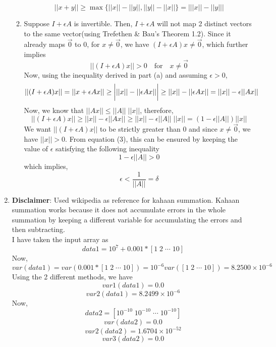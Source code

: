 \documentclass{article}
\begin{document}
\begin{enumerate}
\begin{enumerate}[label=(\alph*)]
        $$||x + y|| \geq \max\{||x|| - ||y||, ||y|| - ||x||\} = {\bigg |} ||x|| - ||y|| {\bigg |}$$
        \item Suppose $I + \epsilon A$ is invertible. Then, $I + \epsilon A$ will not map 2 distinct vectors to the same vector(using Trefethen \& Bau's Theorem 1.2). Since it already maps $\vec{0}$ to $0$, for $x \neq \vec{0}$, we have $(I + \epsilon A)x \neq \vec{0}$, which further implies
        $$||(I + \epsilon A)x|| > 0 \quad \textrm{for} \quad x \neq \vec{0}$$
        Now, using the inequality derived in part (a) and assuming $\epsilon > 0$,
        $$||(I + \epsilon A)x|| = ||x + \epsilon Ax|| \geq \bigg{|} ||x|| - ||\epsilon Ax|| \bigg{|} \geq ||x|| - ||\epsilon Ax|| = ||x|| - \epsilon||Ax||$$
        Now, we know that $||Ax|| \leq ||A||\;||x||$, therefore,
        \begin{equation}
        ||(I + \epsilon A)x|| \geq ||x|| - \epsilon||Ax|| \geq ||x|| - \epsilon||A||\;||x|| = (1 - \epsilon ||A||)||x||
        \end{equation}
        We want $||(I + \epsilon A)x||$ to be strictly greater than 0 and since $x \neq \vec{0}$, we have $||x|| > 0$. From equation (3), this can be ensured by keeping the value of $\epsilon$ satisfying the following inequality
        $$1 - \epsilon ||A|| > 0$$
        which implies,
        $$\epsilon < \frac{1}{||A||} = \delta$$
    \end{enumerate}
    \item \textbf{Disclaimer}: Used wikipedia as reference for kahaan summation. Kahaan summation works because it does not accumulate errors in the whole summation by keeping a different variable for accumulating the errors and then subtracting.\\
    I have taken the input array as
    $$data1 = 10^7 + 0.001 * [1 \; 2 \; \cdots \; 10]$$
    Now,
    $$var(data1) = var(0.001 * [1 \; 2 \; \cdots \; 10]) = 10^{-6} var([1 \; 2 \; \cdots \; 10]) = 8.2500 \times 10^{-6}$$
    Using the 2 different methods, we have
    $$var1(data1) = 0.0$$
    $$var2(data1) = 8.2499 \times 10^{-6}$$
    Now,
    $$data2 = [10^{-10} \; 10^{-10} \; \cdots \; 10^{-10}]$$
    $$var(data2) = 0.0$$
    $$var2(data2) = 1.6704 \times 10^{-52}$$
    $$var3(data2) = 0.0$$
\end{enumerate}
\end{document}
